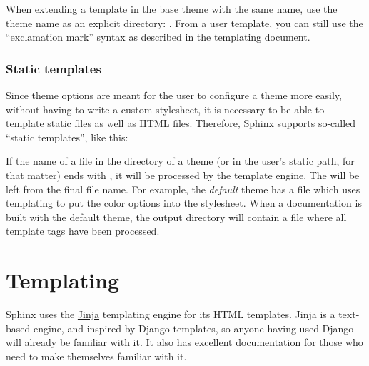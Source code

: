 \documentclass[letterpaper,10pt,english]{sphinxmanual}
\begin{document}
When extending a template in the base theme with the same name, use the theme
name as an explicit directory: .  From a
user  template, you can still use the ``exclamation mark''
syntax as described in the templating document.


\subsection{Static templates}
\label{theming:static-templates}
Since theme options are meant for the user to configure a theme more easily,
without having to write a custom stylesheet, it is necessary to be able to
template static files as well as HTML files.  Therefore, Sphinx supports
so-called ``static templates'', like this:

If the name of a file in the  directory of a theme (or in the user's
static path, for that matter) ends with , it will be processed by the
template engine.  The  will be left from the final file name.  For
example, the \emph{default} theme has a file  which uses
templating to put the color options into the stylesheet.  When a documentation
is built with the default theme, the output directory will contain a
 file where all template tags have been processed.


\chapter{Templating}
\label{templating:id1}\label{templating:templating}\label{templating::doc}
Sphinx uses the \href{http://jinja.pocoo.org}{Jinja} templating engine for its HTML
templates.  Jinja is a text-based engine, and inspired by Django templates, so
anyone having used Django will already be familiar with it.  It also has
excellent documentation for those who need to make themselves familiar with it.
\end{document}

